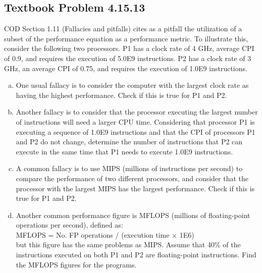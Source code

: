 \documentclass[12pt]{article}
\begin{document}
\subsection{Textbook Problem 4.15.13}
COD Section 1.11 (Fallacies and pitfalls) cites as a pitfall the utilization of a subset of the performance equation as a performance metric. To illustrate this, consider the following two processors. P1 has a clock rate of 4 GHz, average CPI of 0.9, and requires the execution of 5.0E9 instructions. P2 has a clock rate of 3 GHz, an average CPI of 0.75, and requires the execution of 1.0E9 instructions.
\begin{enumerate}[(a)]
    \item One usual fallacy is to consider the computer with the largest clock rate as having the highest performance. Check if this is true for P1 and P2.
    \item Another fallacy is to consider that the processor executing the largest number of instructions will need a larger CPU time. Considering that processor P1 is executing a sequence of 1.0E9 instructions and that the CPI of processors P1 and P2 do not change, determine the number of instructions that P2 can execute in the same time that P1 needs to execute 1.0E9 instructions.
    \item A common fallacy is to use MIPS (millions of instructions per second) to compare the performance of two different processors, and consider that the processor with the largest MIPS has the largest performance. Check if this is true for P1 and P2.
    \item  Another common performance figure is MFLOPS (millions of floating-point operations per second), defined as:\\MFLOPS = No. FP operations / (execution time × 1E6)\\but this figure has the same problems as MIPS. Assume that 40\% of the instructions executed on both P1 and P2 are floating-point instructions. Find the MFLOPS figures for the programs.

\end{enumerate}


\end{document}
